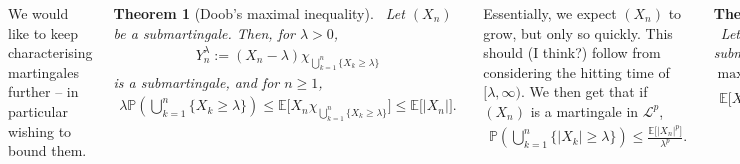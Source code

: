 \documentclass{tikzposter} %
\newcommand\rightopen[2]{\ensuremath{[#1,#2)}}
\newtheorem{theorem}{Theorem}
\begin{document}
\begin{columns}
{    We would like to keep characterising martingales further -- in particular wishing to bound them.
    \begin{theorem}[Doob's maximal inequality]
      \ Let $(X_{n})$ be a submartingale. Then, for $\lambda > 0$,
      \begin{align*}
        Y^{\lambda}_{n} := (X_{n}-\lambda)\chi_{\bigcup_{k=1}^{n} \{X_{k} \ge \lambda\}}
      \end{align*}
      is a submartingale, and for $n \ge 1$,
      \begin{align*}
        \lambda \mathbb{P}\left(\bigcup_{k=1}^{n} \{X_{k} \ge \lambda\}\right) \le \mathbb{E}\big[X_{n} \chi_{\bigcup_{k=1}^{n} \{X_{k} \ge \lambda\}}\big] \le \mathbb{E}\big[|X_{n}|\big].
      \end{align*}
    \end{theorem}

    Essentially, we expect $(X_{n})$ to grow, but only so quickly. This should (I think?) follow from considering the hitting time of $\rightopen{\lambda}{\infty}$. We then get that if $(X_{n})$ is a martingale in $\mathcal{L}^{p}$,
    \begin{align*}
      \mathbb{P}\left(\bigcup_{k = 1}^{n} \{|X_{k}| \ge \lambda \}\right) \le \frac{\mathbb{E}\big[|X_{n}|^{p}\big]}{\lambda^{p}}.
    \end{align*}
    \begin{theorem}[Doob's $\mathcal{L}^{p}$ inequality]
      \ Let $(X_{n})$ be a non-negative submartingale in $\mathcal{L}^{p}$ for $p \ge 1$. Then $\displaystyle \max_{k \le n} X_{k} \in \mathcal{L}^{p}$ and
      \begin{align*}
        \mathbb{E}\big[X^{p}_{n}\big] \le \mathbb{E}\left[\max_{k \le n} X_{k}^{p}\right] \le \left(\frac{p}{p-1}\right)^{p}\mathbb{E}\big[X^{p}_{n}\big].
      \end{align*}
    \end{theorem}
    \hphantom{}

}
\end{columns}
\end{document}
